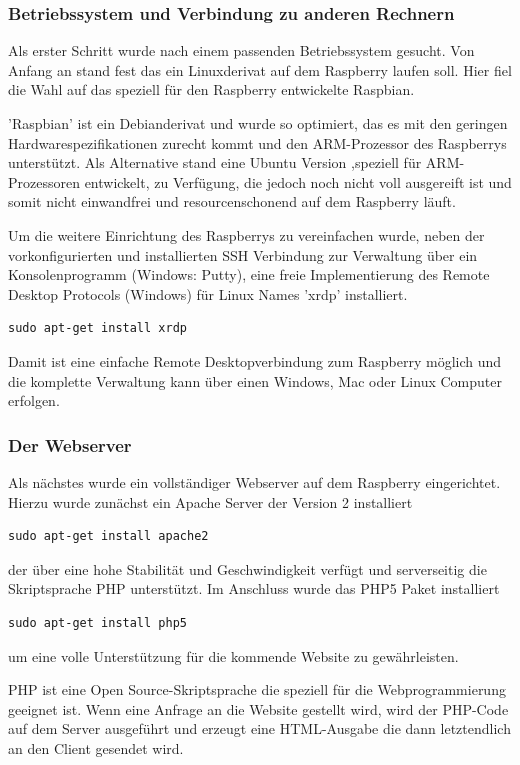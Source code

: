 \documentclass[11pt,a4paper]{article} %
\begin{document}
\subsubsection{Betriebssystem und Verbindung zu anderen Rechnern}
Als erster Schritt wurde nach einem passenden Betriebssystem gesucht. Von Anfang an stand fest das ein Linuxderivat auf dem Raspberry laufen soll. Hier fiel die Wahl auf das speziell für den Raspberry entwickelte Raspbian.
\par
'Raspbian' ist ein Debianderivat und wurde so optimiert, das es mit den geringen Hardwarespezifikationen zurecht kommt und den ARM-Prozessor des Raspberrys unterstützt. Als Alternative stand eine Ubuntu Version ,speziell für ARM-Prozessoren entwickelt, zu Verfügung, die jedoch noch nicht voll ausgereift ist und somit nicht einwandfrei und resourcenschonend auf dem Raspberry läuft.
\par
 Um die weitere Einrichtung des Raspberrys zu vereinfachen wurde, neben der vorkonfigurierten und installierten SSH Verbindung zur Verwaltung über ein Konsolenprogramm (Windows: Putty), eine freie Implementierung des Remote Desktop Protocols (Windows) für Linux Names 'xrdp' installiert. \cite{1}
\begin{frame}

\begin{lstlisting}
sudo apt-get install xrdp
\end{lstlisting}

\end{frame}
Damit ist eine einfache Remote Desktopverbindung zum Raspberry möglich und die komplette Verwaltung kann über einen Windows, Mac oder Linux Computer erfolgen. 
\par
\subsubsection{Der Webserver}
Als nächstes wurde ein vollständiger Webserver auf dem Raspberry eingerichtet. Hierzu wurde zunächst ein Apache Server der Version 2 installiert
\begin{frame}

\begin{lstlisting}
sudo apt-get install apache2
\end{lstlisting}

\end{frame}
 der über eine hohe Stabilität und Geschwindigkeit verfügt und serverseitig die Skriptsprache PHP unterstützt. Im Anschluss wurde das PHP5 Paket installiert
 \begin{frame}

\begin{lstlisting}
sudo apt-get install php5
\end{lstlisting}

\end{frame}
 um eine volle Unterstützung für die kommende Website zu gewährleisten.
 \par
 PHP ist eine Open Source-Skriptsprache die speziell für die Webprogrammierung geeignet ist. Wenn eine Anfrage an die Website gestellt wird, wird der PHP-Code auf dem Server ausgeführt und erzeugt eine HTML-Ausgabe die dann letztendlich an den Client gesendet wird.
 \cite{3}
\par
\end{document}
